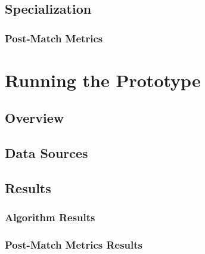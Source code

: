 \documentclass{article}
\begin{document}


\subsection{Specialization}




%

\subsubsection{Post-Match Metrics}



\section{Running the Prototype}

\subsection{Overview}



\subsection{Data Sources}



\subsection{Results}

\subsubsection{Algorithm Results}



\subsubsection{Post-Match Metrics Results}
\end{document}
